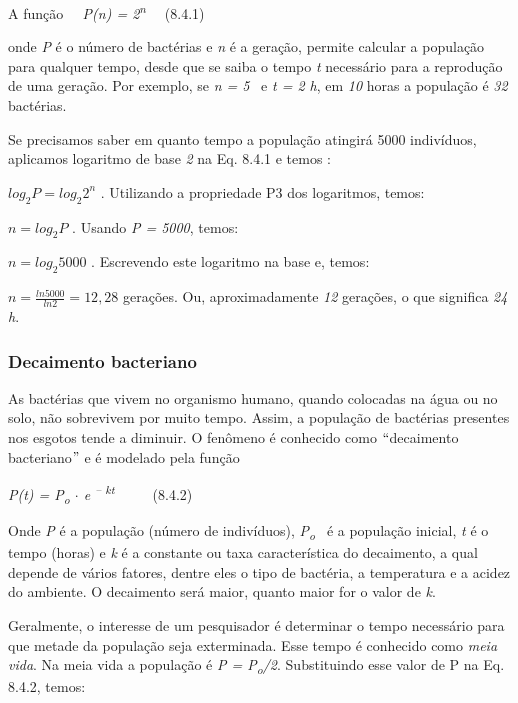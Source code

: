 A função\textit{~~ P(n) = 2\textsuperscript{n}~~ \quad \quad \quad \quad \quad \quad \quad \quad }(8.4.1)

onde \textit{P} é o número de bactérias e \textit{n }é a geração, permite calcular a população para qualquer tempo, desde que se saiba o tempo \textit{t} necessário para a reprodução de uma geração. Por exemplo, se \textit{n = 5}~ e \textit{t = 2 h}, em \textit{10} horas a população é \textit{32} bactérias. 

Se precisamos saber em quanto tempo a população atingirá 5000 indivíduos, aplicamos logaritmo de base \textit{2} na Eq. 8.4.1 e temos :

\( log_{2}P=log_{2}2^{n} \) . Utilizando a propriedade P3 dos logaritmos, temos:

\( n=log_{2}P \) . Usando \textit{P = 5000}, temos:

\( n=log_{2}5000 \)  . Escrevendo este logaritmo na base e, temos:

\( n=\frac{ln5000}{ln2}=12,28 \)  gerações. Ou, aproximadamente \textit{12} gerações, o que significa \textit{24 h}.

\subsubsection{Decaimento bacteriano}

As bactérias que vivem no organismo humano, quando colocadas na água ou no solo, não sobrevivem por muito tempo. Assim, a população de bactérias presentes nos esgotos tende a diminuir. O fenômeno é conhecido como $``$decaimento bacteriano$"$  e é modelado pela função 

\textit{P(t) = P\textsubscript{o} $ \cdot $  e \textsuperscript{– kt}}{ \textit{~~~~ \quad \quad \quad \quad \quad \quad \quad }(8.4.2)}

Onde \textit{P} é a população (número de indivíduos), \textit{P\textsubscript{o}~ }é a população inicial, \textit{t} é o tempo (horas) e \textit{k} é a constante ou taxa característica do decaimento, a qual depende de vários fatores, dentre eles o tipo de bactéria, a temperatura e a acidez do ambiente. O decaimento será maior, quanto maior for o valor de \textit{k}. 

Geralmente, o interesse de um pesquisador é determinar o tempo necessário para que metade da população seja exterminada. Esse tempo é conhecido como \textit{meia vida}. Na meia vida a população é \textit{P = P\textsubscript{o}/2}. Substituindo esse valor de P na Eq. 8.4.2, temos:


